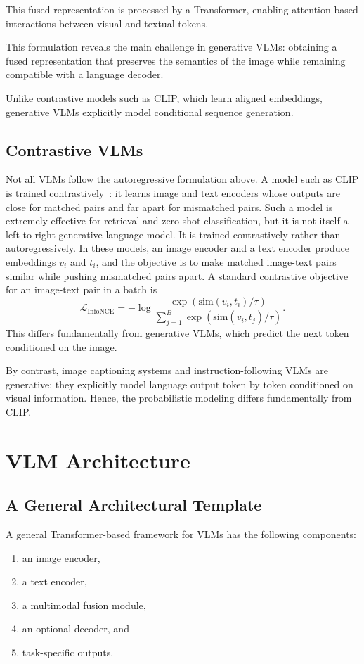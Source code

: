 \documentclass{article}
\begin{document}
This fused representation is processed by a Transformer, enabling attention-based interactions between visual and textual tokens.

This formulation reveals the main challenge in generative VLMs: obtaining a fused representation that preserves the semantics of the image while remaining compatible with a language decoder.

Unlike contrastive models such as CLIP, which learn aligned embeddings, generative VLMs explicitly model conditional sequence generation.

\subsection{Contrastive VLMs}
Not all VLMs follow the autoregressive formulation above. A model such as CLIP is trained contrastively~\cite{radford2021}: it learns image and text encoders whose outputs are close for matched pairs and far apart for mismatched pairs. Such a model is extremely effective for retrieval and zero-shot classification, but it is not itself a left-to-right generative language model. It is trained contrastively rather than autoregressively. In these models, an image encoder and a text encoder produce embeddings \(v_i\) and \(t_i\), and the objective is to make matched image-text pairs similar while pushing mismatched pairs apart. A standard contrastive objective for an image-text pair in a batch is
\[
\mathcal{L}_{\text{InfoNCE}}
=
-\log
\frac{\exp(\mathrm{sim}(v_i,t_i)/\tau)}
{\sum_{j=1}^{B}\exp(\mathrm{sim}(v_i,t_j)/\tau)}.
\]
This differs fundamentally from generative VLMs, which predict the next token conditioned on the image.

By contrast, image captioning systems and instruction-following VLMs are generative: they explicitly model language output token by token conditioned on visual information. Hence, the probabilistic modeling differs fundamentally from CLIP.

\section{VLM Architecture}
\subsection{A General Architectural Template}

A general Transformer-based framework for VLMs has the following components:
\begin{enumerate}
    \item an image encoder,
    \item a text encoder,
    \item a multimodal fusion module,
    \item an optional decoder, and
    \item task-specific outputs.
\end{enumerate}
\end{document}
